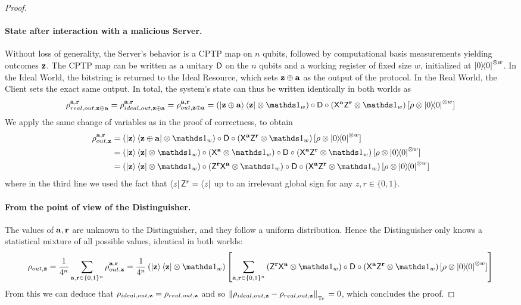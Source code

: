 \begin{proof}
\paragraph{State after interaction with a malicious Server.}
Without loss of generality, the Server's behavior is a CPTP map on $n$ qubits, followed by computational basis measurements yielding outcomes $\mathbf z$. The CPTP map can be written as a unitary $\mathsf{D}$ on the $n$ qubits and a working register of fixed size $w$, initialized at $\ketbra0^{\otimes w}$.
In the Ideal World, the bitstring is returned to the Ideal Resource, which sets $\mathbf z\oplus\mathbf a$ as the output of the protocol. In the Real World, the Client sets the exact same output.
In total, the system's state can thus be written identically in both worlds as
\begin{equation}
    \rho^{\a, \r}_{real, out, \z\oplus\a}=
    \rho^{\a, \r}_{ideal, out, \z\oplus\a}=
    \rho^{\a, \r}_{out, \z\oplus\a}=
    \left( \ket{\z\oplus\a}\bra{\z}\otimes \id_w \right) \circ \D \circ \left( \Enc{\a}{\r} \otimes \id_w \right)[\rho\otimes \ketbra0^{\otimes w}]
\end{equation}
We apply the same change of variables as in the proof of correctness, to obtain
\begin{align}
    \rho^{\a, \r}_{out, \z}
    &=
    \left( \ket{\z}\bra{\z\oplus\a}\otimes \id_w \right)\circ \D \circ \left( \Enc{\a}{\r} \otimes \id_w \right)[\rho\otimes \ketbra0^{\otimes w}]
    \\
    &=\left( \ket{\z}\bra{\z} \otimes \id_w \right)\circ \left( \X^\a \otimes \id_w \right)\circ \D \circ \left( \Enc{\a}{\r} \otimes \id_w \right)[\rho\otimes \ketbra0^{\otimes w}]
    \\
    &=\left( \ket{\z}\bra{\z} \otimes \id_w \right)\circ \left( \Dec{\a}{\r} \otimes \id_w \right)\circ \D \circ \left( \Enc{\a}{\r} \otimes \id_w \right)[\rho\otimes \ketbra0^{\otimes w}]
\end{align}
where in the third line we used the fact that $\bra z \mathsf{Z}^r = \bra z$ up to an irrelevant global sign for any $z, r \in\{0,1\}$.

\paragraph{From the point of view of the Distinguisher.}
The values of $\mathbf a, \mathbf r$ are unknown to the Distinguisher, and they follow a uniform distribution. Hence the Distinguisher only knows a statistical mixture of all possible values, identical in both worlds:
\begin{equation}
    \rho_{out, \z} =
    \dfrac{1}{4^n}
    \sum_{\a, \r\in\{0,1\}^n}
    \rho^{\a, \r}_{out, \z}
    =
    \dfrac{1}{4^n}
    \left( \ket{\z}\bra{\z} \otimes \id_w \right)
    \left[ \sum_{\a, \r\in\{0,1\}^n}
    \left( \Dec{\a}{\r} \otimes \id_w \right)\circ \D \circ \left( \Enc{\a}{\r} \otimes \id_w \right)[\rho\otimes \ketbra0^{\otimes w}] \right]
\end{equation}
From this we can deduce that $\rho_{ideal, out, \mathbf z} = \rho_{real, out, \mathbf z}$ and so $\norm{\rho_{ideal, out, \mathbf z}-\rho_{real, out, \mathbf z}}_{\Tr\strut} = 0$, which concludes the proof.

\end{proof}

